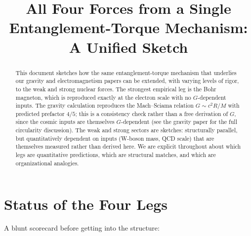 \documentclass[11pt,letterpaper]{article}
\title{All Four Forces from a Single Entanglement-Torque Mechanism:\\
A Unified Sketch}
\author{}
\date{}
\begin{document}
\maketitle

\begin{abstract}
This document sketches how the same entanglement-torque mechanism that
underlies our gravity and electromagnetism papers can be extended, with
varying levels of rigor, to the weak and strong nuclear forces. The
strongest empirical leg is the Bohr magneton, which is reproduced
exactly at the electron scale with no $G$-dependent inputs. The
gravity calculation reproduces the Mach--Sciama relation $G \sim c^2 R/M$
with predicted prefactor $4/5$; this is a consistency check rather
than a free derivation of $G$, since the cosmic inputs are themselves
$G$-dependent (see the gravity paper for the full circularity
discussion). The weak and strong sectors are sketches: structurally
parallel, but quantitatively dependent on inputs (W-boson mass, QCD
scale) that are themselves measured rather than derived here. We are
explicit throughout about which legs are quantitative predictions,
which are structural matches, and which are organizational analogies.
\end{abstract}

\section{Status of the Four Legs}

A blunt scorecard before getting into the structure:
\end{document}
